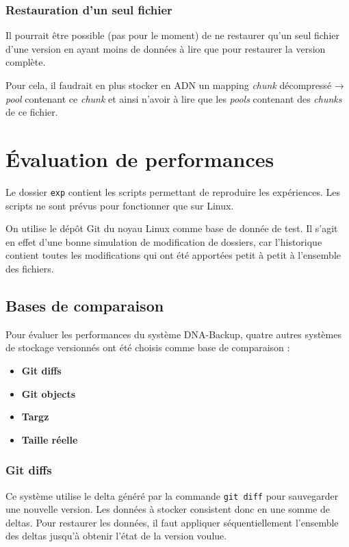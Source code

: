 \documentclass[a4paper]{article}
\begin{document}
\subsubsection{Restauration d'un seul
fichier}

Il pourrait être possible (pas pour le moment) de ne restaurer qu'un
seul fichier d'une version en ayant moins de données à lire que pour
restaurer la version complète.

Pour cela, il faudrait en plus stocker en ADN un mapping \emph{chunk}
décompressé → \emph{pool} contenant ce \emph{chunk} et ainsi n'avoir à
lire que les \emph{pools} contenant des \emph{chunks} de ce fichier.

\section{Évaluation de performances}

Le dossier \verb|exp| contient les scripts permettant de reproduire
les expériences. Les scripts ne sont prévus pour fonctionner que sur
Linux.

On utilise le dépôt Git du noyau Linux comme base de donnée de test. Il
s'agit en effet d'une bonne simulation de modification de dossiers, car
l'historique contient toutes les modifications qui ont été apportées
petit à petit à l'ensemble des fichiers.

\subsection{Bases de comparaison}

Pour évaluer les performances du système DNA-Backup, quatre autres
systèmes de stockage versionnés ont été choisis comme base de
comparaison :

\begin{itemize}
\item
  \textbf{Git diffs}
\item
  \textbf{Git objects}
\item
  \textbf{Targz}
\item
  \textbf{Taille réelle}
\end{itemize}

\subsubsection{Git diffs}

Ce système utilise le delta généré par la commande \verb|git diff|
pour sauvegarder une nouvelle version. Les données à stocker consistent
donc en une somme de deltas. Pour restaurer les données, il faut
appliquer séquentiellement l'ensemble des deltas jusqu'à obtenir l'état
de la version voulue.
\end{document}
